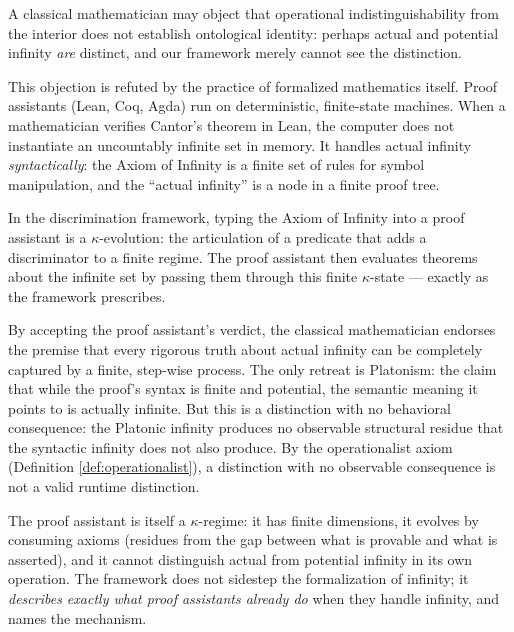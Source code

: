 \begin{remark}
\label{rem:proof-assistant}
A classical mathematician may object that operational
indistinguishability from the interior does not establish
ontological identity: perhaps actual and potential infinity
\emph{are} distinct, and our framework merely cannot see
the distinction.

This objection is refuted by the practice of formalized
mathematics itself. Proof assistants (Lean, Coq, Agda)
run on deterministic, finite-state machines. When a
mathematician verifies Cantor's theorem in Lean, the
computer does not instantiate an uncountably infinite set
in memory. It handles actual infinity \emph{syntactically}:
the Axiom of Infinity is a finite set of rules for symbol
manipulation, and the ``actual infinity'' is a node in a
finite proof tree.

In the discrimination framework, typing the Axiom of
Infinity into a proof assistant is a $\kappa$-evolution:
the articulation of a predicate that adds a discriminator
to a finite regime. The proof assistant then evaluates
theorems about the infinite set by passing them through
this finite $\kappa$-state --- exactly as the framework
prescribes.

By accepting the proof assistant's verdict, the classical
mathematician endorses the premise that every rigorous
truth about actual infinity can be completely captured by
a finite, step-wise process. The only retreat is Platonism:
the claim that while the proof's syntax is finite and
potential, the semantic meaning it points to is actually
infinite. But this is a distinction with no behavioral
consequence: the Platonic infinity produces no observable
structural residue that the syntactic infinity does not
also produce. By the operationalist axiom
(Definition \ref{def:operationalist}),
a distinction with no observable consequence is not a
valid runtime distinction.

The proof assistant is itself a $\kappa$-regime: it has
finite dimensions, it evolves by consuming axioms
(residues from the gap between what is provable and what
is asserted), and it cannot distinguish actual from
potential infinity in its own operation. The framework
does not sidestep the formalization of infinity; it
\emph{describes exactly what proof assistants already do}
when they handle infinity, and names the mechanism.
\end{remark}

